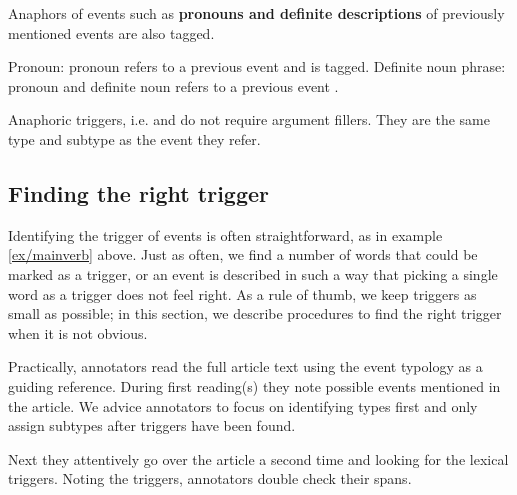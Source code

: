 Anaphors of events such as \textbf{pronouns and definite descriptions} of previously mentioned events are also tagged.

\begin{exe}
    \ex\label{ex/pronoun1} Pronoun: 
        \expl pronoun  refers to a previous  event and is tagged.
    \ex\label{ex/pronoun1} Definite noun phrase: 
        \expl pronoun  and definite noun  refers to a previous event .
\end{exe}

Anaphoric triggers, i.e.  and  do not require argument fillers.
They are the same type and subtype as the event they refer.


\subsection{Finding the right trigger}

Identifying the trigger of events is often straightforward, as in example \ref{ex/mainverb} above. Just as often, we find a number of words that could be marked as a trigger, or an event is described in such a way that picking a single word as a trigger does not feel right. As a rule of thumb, we keep triggers as small as possible; in this section, we describe procedures to find the right trigger when it is not obvious.

Practically, annotators read the full article text using the event typology as a guiding reference.
During first reading(s) they note possible events mentioned in the article.
We advice annotators to focus on identifying types first and only assign subtypes after triggers have been found.

Next they attentively go over the article a second time and looking for the lexical triggers.
Noting the triggers, annotators double check their spans.



